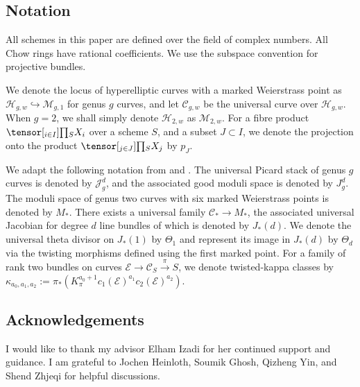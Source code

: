 \documentclass[11pt]{amsart}
\numberwithin{theorem}{section}
\numberwithin{lemma}{section}
\theoremstyle{definition}
\newcommand{\ri}{\rightarrow}
\newcommand{\J}{\mathscr{J}}
\newcommand{\m}{\mathcal{M}}
\newcommand{\h}{\mathcal{H}}
\newcommand{\E}{\mathscr{E}}
\newcommand{\C}{\mathscr{C}}
\newcommand{\mC}{\mathcal{C}}
\newcommand{\ka}{\kappa}
\newcommand{\T}{\Theta}
\newcommand{\hr}{\hookrightarrow}
\begin{document}
	\subsection{Notation}\label{notation}
	\noindent All schemes in this paper are defined over the field of complex numbers. 
	All Chow rings have rational coefficients. We use the subspace convention for projective bundles. 
	
	We denote the locus of hyperelliptic curves with a marked Weierstrass point as $\mathcal{H}_{g,w}\hr \mathcal{M}_{g,1}$ for genus $g$ curves, and let $\mC_{g,w}$ be the universal curve over $\mathcal{H}_{g,w}$. 
	When $g=2$, we shall simply denote $\h_{2,w}$ as $\m_{2,w}$.
	For a fibre product $\tensor[_{i\in I}]{\prod}{_S}X_i$ over a scheme $S$, and a subset $J\subset I$, we denote the projection onto the product $\tensor[_{j\in J}]{\prod}{_S}X_j$ by $p_J$. 

	We adapt the following notation from \cite{shubham-r2} and \cite{larson-24}. The universal Picard stack of genus $g$ curves is denoted by $\J^d_g$, and the associated good moduli space is denoted by $J^d_g$.
	The moduli space of genus two curves with six marked Weierstrass points is denoted by $M_*$. There exists a universal family $\C_*\ri M_*$, the associated universal Jacobian for degree $d$ line bundles of which is denoted by $J_*(d)$.
	We denote the universal theta divisor on $J_*(1)$ by $\Theta_1$ and represent its image in $J_*(d)$ by $\T_d$ via the twisting morphisms defined using the first marked point.
	For a family of rank two bundles on curves $\E\ri\C_S\xrightarrow{\pi} S$, we denote twisted-kappa classes by $\ka_{a_0,a_1,a_2}:= \pi_*(K_\pi^{a_0+1}c_1(\E)^{a_1}c_2(\E)^{a_2})$.
\subsection*{Acknowledgements} 
I would like to thank my advisor Elham Izadi for her continued support and guidance. I am grateful to Jochen Heinloth, Soumik Ghosh, Qizheng Yin, and Shend Zhjeqi for helpful discussions.
\end{document}
